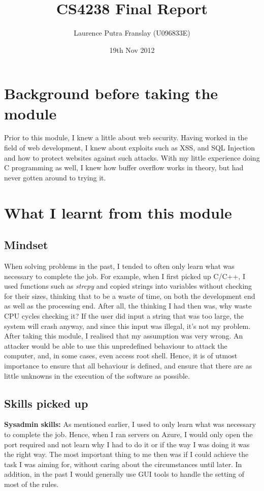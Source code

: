 \documentclass[12pt]{article}
\begin{document}
\title{CS4238 Final Report}
\author{Laurence Putra Franslay (U096833E)}
\date{19th Nov 2012}
\maketitle

\section{Background before taking the module}
Prior to this module, I knew a little about web security. Having worked in the field of web development, I knew about exploits such as XSS, and SQL Injection and how to protect websites against such attacks. With my little experience doing C programming as well, I knew how buffer overflow works in theory, but had never gotten around to trying it.

\section{What I learnt from this module}
\subsection{Mindset}
When solving problems in the past, I tended to often only learn what was necessary to complete the job. For example, when I first picked up C/C++, I used functions such as \emph{strcpy} and copied strings into variables without checking for their sizes, thinking that to be a waste of time, on both the development end as well as the processing end. After all, the thinking I had then was, why waste CPU cycles checking it? If the user did input a string that was too large, the system will crash anyway, and since this input was illegal, it's not my problem. \\

After taking this module, I realised that my assumption was very wrong. An attacker would be able to use this unpredefined behaviour to attack the computer, and, in some cases, even access root shell. Hence, it is of utmost importance to ensure that all behaviour is defined, and ensure that there are as little unknowns in the execution of the software as possible. \\

\subsection{Skills picked up}
\textbf{Sysadmin skills:} As mentioned earlier, I used to only learn what was necessary to complete the job. Hence, when I ran servers on Azure, I would only open the port required and not learn why I had to do it or if the way I was doing it was the right way. The most important thing to me then was if I could achieve the task I was aiming for, without caring about the circumstances until later. In addition, in the past I would generally use GUI tools to handle the setting of most of the rules. \\
\end{document}
